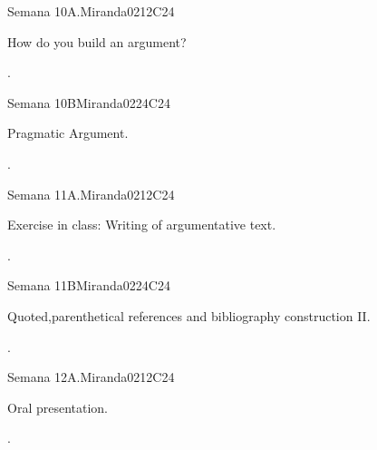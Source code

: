 \begin{syllabus}
\begin{unit}{Semana 10A.}{}{Miranda02}{12}{C24}
   \begin{topics}
      \item How do you build an argument?
   \end{topics}
   \begin{learningoutcomes}
      \item .
   \end{learningoutcomes}
\end{unit}

\begin{unit}{Semana 10B}{}{Miranda02}{24}{C24}
   \begin{topics}
      \item Pragmatic Argument.
   \end{topics}

   \begin{learningoutcomes}
      \item . 
      \end{learningoutcomes}
\end{unit}

\begin{unit}{Semana 11A.}{}{Miranda02}{12}{C24}
   \begin{topics}
      \item Exercise in class: Writing of argumentative text.
   \end{topics}
   \begin{learningoutcomes}
      \item .
   \end{learningoutcomes}
\end{unit}

\begin{unit}{Semana 11B}{}{Miranda02}{24}{C24}
   \begin{topics}
      \item Quoted,parenthetical references and bibliography construction II.
   \end{topics}

   \begin{learningoutcomes}
      \item .
      \end{learningoutcomes}
\end{unit}

\begin{unit}{Semana 12A.}{}{Miranda02}{12}{C24}
   \begin{topics}
      \item Oral presentation.
   \end{topics}
   \begin{learningoutcomes}
      \item .
   \end{learningoutcomes}
\end{unit}


\end{syllabus}
